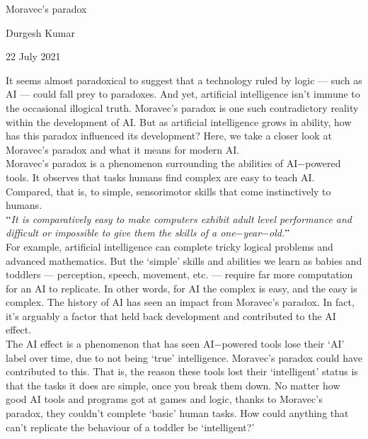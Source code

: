 \documentclass[12pt]{article}
\begin{document}
\begin{center}
{\LARGE Moravec's paradox}
\end{center}


\begin{center}
{\large Durgesh Kumar}
\end{center}


\begin{center}
{\large 22 July 2021}
\end{center}


\vspace{1\baselineskip}
It seems almost paradoxical to suggest that a technology ruled by logic — such as AI — could fall prey to paradoxes. And yet, artificial intelligence isn’t immune to the occasional illogical truth. Moravec’s paradox is one such contradictory reality within the development of AI. But as artificial intelligence grows in ability, how has this paradox influenced its development? Here, we take a closer look at Moravec’s paradox and what it means for modern AI.
\\

Moravec’s paradox is a phenomenon surrounding the abilities of AI$-$powered tools. It observes that tasks humans find complex are easy to teach AI. Compared, that is, to simple, sensorimotor skills that come instinctively to humans.
\\

\textit{$``$It is comparatively easy to make computers exhibit adult level performance and difficult or impossible to give them the skills of a one$-$year$-$old.$"$}
\\

For example, artificial intelligence can complete tricky logical problems and advanced mathematics. But the ‘simple’ skills and abilities we learn as babies and toddlers — perception, speech, movement, etc. — require far more computation for an AI to replicate. In other words, for AI the complex is easy, and the easy is complex. The history of AI has seen an impact from Moravec’s paradox. In fact, it’s arguably a factor that held back development and contributed to the AI effect.
\\

The AI effect is a phenomenon that has seen AI$-$powered tools lose their ‘AI’ label over time, due to not being ‘true’ intelligence. Moravec’s paradox could have contributed to this. That is, the reason these tools lost their ‘intelligent’ status is that the tasks it does are simple, once you break them down.  No matter how good AI tools and programs got at games and logic, thanks to Moravec’s paradox, they couldn’t complete ‘basic’ human tasks. How could anything that can’t replicate the behaviour of a toddler be ‘intelligent?’
\\
\end{document}
